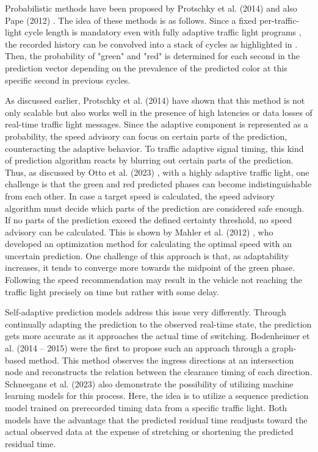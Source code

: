 Probabilistic methods have been proposed by Protschky et al. (2014) \cite{protschky_extensive_2014, protschky_adaptive_2014} and also Pape (2012) \cite{pape_untersuchung_2012}. The idea of these methods is as follows. Since a fixed per-traffic-light cycle length is mandatory even with fully adaptive traffic light programs \cite{protschky_extensive_2014}, the recorded history can be convolved into a stack of cycles as highlighted in . Then, the probability of "green" and "red" is determined for each second in the prediction vector depending on the prevalence of the predicted color at this specific second in previous cycles.

As discussed earlier, Protschky et al. (2014) \cite{protschky_extensive_2014, protschky_adaptive_2014} have shown that this method is not only scalable but also works well in the presence of high latencies or data losses of real-time traffic light messages. Since the adaptive component is represented as a probability, the speed advisory can focus on certain parts of the prediction, counteracting the adaptive behavior. To traffic adaptive signal timing, this kind of prediction algorithm reacts by blurring out certain parts of the prediction. Thus, as discussed by Otto et al. (2023) \cite{otto_framework_2023}, with a highly adaptive traffic light, one challenge is that the green and red predicted phases can become indistinguishable from each other. In case a target speed is calculated, the speed advisory algorithm must decide which parts of the prediction are considered safe enough. If no parts of the prediction exceed the defined certainty threshold, no speed advisory can be calculated. This is shown by Mahler et al. (2012) \cite{mahler_reducing_2012}, who developed an optimization method for calculating the optimal speed with an uncertain prediction. One challenge of this approach is that, as adaptability increases, it tends to converge more towards the midpoint of the green phase. Following the speed recommendation may result in the vehicle not reaching the traffic light precisely on time but rather with some delay.

Self-adaptive prediction models address this issue very differently. Through continually adapting the prediction to the observed real-time state, the prediction gets more accurate as it approaches the actual time of switching. Bodenheimer et al. (2014 -- 2015) \cite{bodenheimer_enabling_2014, bodenheimer_glosa_2015} were the first to propose such an approach through a graph-based method. This method observes the ingress directions at an intersection node and reconstructs the relation between the clearance timing of each direction. Schneegans et al. (2023) \cite{schneegans_prediction_2023} also demonstrate the possibility of utilizing machine learning models for this process. Here, the idea is to utilize a sequence prediction model trained on prerecorded timing data from a specific traffic light. Both models have the advantage that the predicted residual time readjusts toward the actual observed data at the expense of stretching or shortening the predicted residual time.


